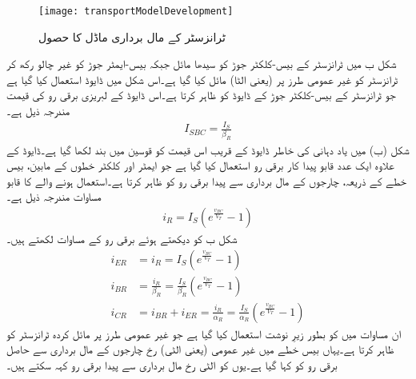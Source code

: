 \begin{figure}
\centering
\texttt{[image: transportModelDevelopment]}
\caption{ ٹرانزسٹر کے مال برداری ماڈل کا حصول}
\label{شکل_ٹرانزسٹر کے مال برداری ماڈل کا حصول}
\end{figure}
شکل  ب میں ٹرانزسٹر کے بیس-کلکٹر جوڑ کو سیدھا مائل جبکہ بیس-ایمٹر  جوڑ کو غیر چالو رکھ کر ٹرانزسٹر کو غیر عمومی طرز پر (یعنی الٹا) مائل کیا گیا ہے۔اس شکل میں ڈایوڈ  استعمال کیا گیا ہے جو ٹرانزسٹر کے بیس-کلکٹر جوڑ کے ڈایوڈ کو ظاہر کرتا ہے۔اس ڈایوڈ کے لبریزی برقی رو  کی قیمت مندرجہ ذیل ہے۔
\begin{align}
I_{SBC}=\frac{I_S}{\beta_R}
\end{align}
شکل (ب) میں یاد دہانی کی خاطر ڈایوڈ کے قریب اس قیمت کو قوسین میں بند لکھا گیا ہے۔ڈایوڈ کے علاوہ ایک عدد قابو پیدا کار برقی رو استعمال کیا گیا ہے جو ایمٹر اور کلکٹر  خطوں کے مابین، بیس خطے کے ذریعہ، چارجوں کے مال برداری سے پیدا برقی رو کو ظاہر کرتا ہے۔استعمال ہونے والے   کا قابو مساوات مندرجہ ذیل ہے۔
\begin{align}
i_R=I_S \left (e^{\frac{v_{BC}}{V_T}}-1 \right )
\end{align}
شکل  ب کو دیکھتے ہوئے برقی رو کے مساوات لکھتے ہیں۔
\begin{align} \label{مساوات_ٹرانزسٹر_مال_برداری_الٹے_رو}
i_{ER}&=i_R=I_S \left (e^{\frac{v_{BC}}{V_T}}-1 \right )\\
i_{BR}&=\frac{i_R}{\beta_R}=\frac{I_S}{\beta_R} \left (e^{\frac{v_{BC}}{V_T}}-1 \right ) \\
i_{CR}&=i_{BR}+i_{ER}=\frac{i_R}{\alpha_R}=\frac{I_S}{\alpha_R} \left (e^{\frac{v_{BC}}{V_T}}-1 \right )
\end{align}
ان مساوات میں  کو بطور زیرِ نوشت استعمال کیا گیا ہے جو غیر عمومی طرز پر مائل کردہ ٹرانزسٹر کو ظاہر کرتا ہے۔یہاں بیس خطے میں غیر عمومی (یعنی الٹی) رخ چارجوں کے مال برداری سے حاصل برقی رو کو  کہا گیا ہے۔یوں  کو الٹی رخ مال برداری سے پیدا برقی رو کہہ سکتے ہیں۔

